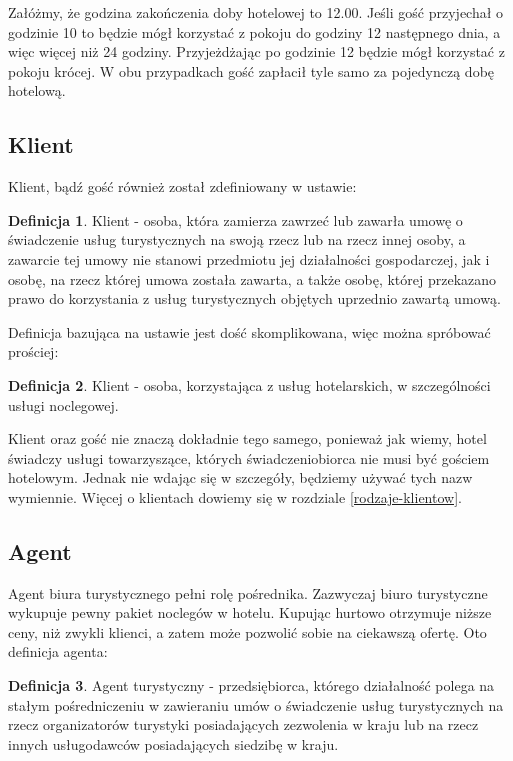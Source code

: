 \documentclass[a4paper,onecolumn,oneside,11pt,wide,floatssmall]{mwrep}
\theoremstyle{definition}
\newtheorem{defn}{Definicja}[section]
\theoremstyle{plain}%
\theoremstyle{remark}
\begin{document}
Załóżmy, że godzina zakończenia doby hotelowej to 12.00. Jeśli gość 
przyjechał o godzinie 10 to będzie mógł korzystać z pokoju do godziny 12 
następnego dnia, a więc więcej niż 24 godziny. Przyjeżdżając po godzinie 12 
będzie mógł korzystać z pokoju krócej. W obu przypadkach gość zapłacił tyle 
samo za pojedynczą dobę hotelową.


\subsection{Klient}

Klient, bądź gość również został zdefiniowany w ustawie\cite{ust:tur}:

\begin{defn}{Klient}
- osoba, która zamierza zawrzeć lub zawarła umowę o świadczenie usług 
turystycznych na swoją rzecz lub na rzecz innej osoby, a zawarcie tej umowy 
nie stanowi przedmiotu jej działalności gospodarczej, jak i osobę, na rzecz 
której umowa została zawarta, a także osobę, której przekazano prawo do 
korzystania z usług turystycznych objętych uprzednio zawartą umową.

\end{defn}

Definicja bazująca na ustawie jest dość skomplikowana, więc można spróbować 
prościej:

\begin{defn}{Klient}
- osoba, korzystająca z usług hotelarskich, w szczególności usługi noclegowej.

\end{defn}

Klient oraz gość nie znaczą dokładnie tego samego, ponieważ jak wiemy, 
hotel świadczy usługi towarzyszące, których świadczeniobiorca nie musi być 
gościem hotelowym. Jednak nie wdając się w szczegóły, 
będziemy używać tych nazw wymiennie. Więcej o klientach dowiemy się w rozdziale
\ref{rodzaje-klientow}.

\subsection{Agent}
Agent biura turystycznego pełni rolę pośrednika. Zazwyczaj biuro turystyczne 
wykupuje pewny pakiet noclegów w hotelu. Kupując hurtowo otrzymuje niższe 
ceny, niż zwykli klienci, a zatem może pozwolić sobie na ciekawszą ofertę. 
Oto definicja agenta\cite{ust:tur}:

\begin{defn}{Agent turystyczny}
- przedsiębiorca, którego działalność polega na stałym pośredniczeniu w 
zawieraniu umów o świadczenie usług turystycznych na rzecz organizatorów 
turystyki posiadających zezwolenia w kraju lub na rzecz innych usługodawców 
posiadających siedzibę w kraju.
\end{defn}
\end{document}
